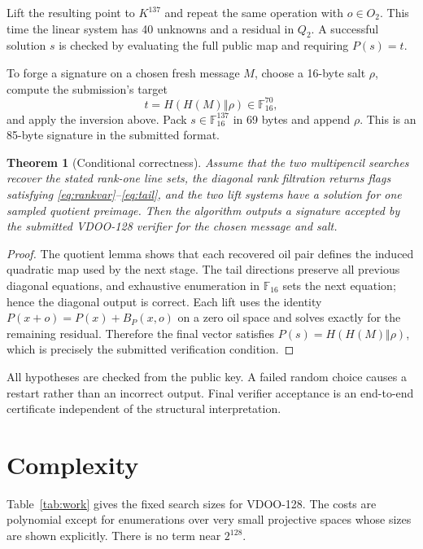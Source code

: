 \documentclass[11pt]{article}
\newtheorem{theorem}{Theorem}
\newcommand{\F}{\mathbb{F}}
\begin{document}
Lift the resulting point to $K^{137}$ and repeat the same operation with
$o\in O_2$.  This time the linear system has 40 unknowns and a residual in
$Q_2$.  A successful solution $s$ is checked by evaluating the full public
map and requiring $P(s)=t$.

To forge a signature on a chosen fresh message $M$, choose a 16-byte salt
$\rho$, compute the submission's target
\[
       t=H(H(M)\mathbin\Vert\rho)\in\F_{16}^{70},
\]
and apply the inversion above.  Pack $s\in\F_{16}^{137}$ in 69 bytes and
append $\rho$.  This is an 85-byte signature in the submitted format.

\begin{theorem}[Conditional correctness]
Assume that the two multipencil searches recover the stated rank-one line
sets, the diagonal rank filtration returns flags satisfying
\eqref{eq:rankvar}--\eqref{eq:tail}, and the two lift systems have a solution
for one sampled quotient preimage.  Then the algorithm outputs a signature
accepted by the submitted VDOO-128 verifier for the chosen message and salt.
\end{theorem}

\begin{proof}
The quotient lemma shows that each recovered oil pair defines the induced
quadratic map used by the next stage.  The tail directions preserve all
previous diagonal equations, and exhaustive enumeration in $\F_{16}$ sets the
next equation; hence the diagonal output is correct.  Each lift uses the
identity $P(x+o)=P(x)+B_P(x,o)$ on a zero oil space and solves exactly for the
remaining residual.  Therefore the final vector satisfies
$P(s)=H(H(M)\Vert\rho)$, which is precisely the submitted verification
condition.
\end{proof}

All hypotheses are checked from the public key.  A failed random choice causes
a restart rather than an incorrect output.  Final verifier acceptance is an
end-to-end certificate independent of the structural interpretation.

\section{Complexity}

Table~\ref{tab:work} gives the fixed search sizes for VDOO-128.  The costs are
polynomial except for enumerations over very small projective spaces whose
sizes are shown explicitly.  There is no term near $2^{128}$.
\end{document}
